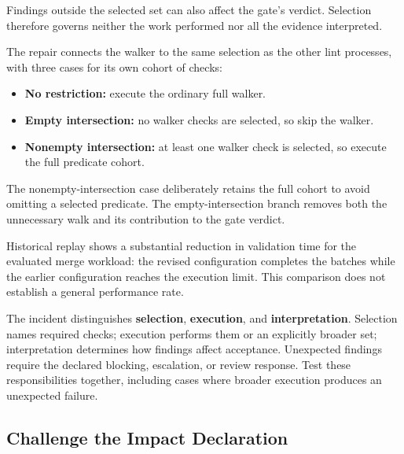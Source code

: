Findings outside the selected set can also affect the gate's verdict. Selection therefore governs neither the work performed nor all the evidence interpreted.

The repair connects the walker to the same selection as the other lint processes, with three cases for its own cohort of checks:

\begin{itemize}
\tightlist
\item
  \textbf{No restriction:} execute the ordinary full walker.
\item
  \textbf{Empty intersection:} no walker checks are selected, so skip the walker.
\item
  \textbf{Nonempty intersection:} at least one walker check is selected, so execute the full predicate cohort.
\end{itemize}

The nonempty-intersection case deliberately retains the full cohort to avoid omitting a selected predicate. The empty-intersection branch removes both the unnecessary walk and its contribution to the gate verdict.

Historical replay shows a substantial reduction in validation time for the evaluated merge workload: the revised configuration completes the batches while the earlier configuration reaches the execution limit. This comparison does not establish a general performance rate.

The incident distinguishes \textbf{selection}, \textbf{execution}, and \textbf{interpretation}. Selection names required checks; execution performs them or an explicitly broader set; interpretation determines how findings affect acceptance. Unexpected findings require the declared blocking, escalation, or review response. Test these responsibilities together, including cases where broader execution produces an unexpected failure.

\subsection*{Challenge the Impact Declaration}\label{heading:challenge-the-impact-declaration}

